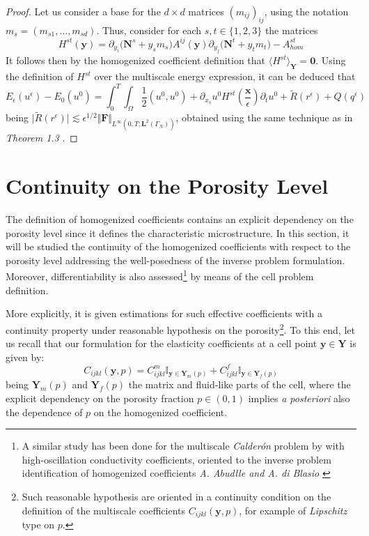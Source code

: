 \begin{proof}
Let us consider a base for the $d\times d$ matrices $(m_{ij})_{ij}$, using the notation $m_s = (m_{s1}, \dots, m_{sd})$. Thus, consider for each $s, t \in \{1,2,3\}$ the matrices 
\begin{equation*}
    H^{st}(\mathbf{y}) = \partial_{y_i}\big(\mathbf{N}^s + y_s m_s\big) A^{ij}(\mathbf{y}) \partial_{y_j} \big(\mathbf{N}^t +  y_t m_t\big) - A^{st}_{hom}
\end{equation*}
It follows then by the homogenized coefficient definition that $\langle H^{st} \rangle_{\mathbf{Y}} = \mathbf{0}$.
Using the definition of $H^{st}$ over the multiscale energy expression, it can be deduced that
\begin{equation*}
    E_{\epsilon}(u^{\epsilon}) - E_{0}(u^{0}) = \int_0^T \int_{\Omega} \frac{1}{2}(u^0, u^0) + \partial_{x_s}u^0 H^{st}(\frac{\mathbf{x}}{\epsilon}) \partial_{t}u^0  + \tilde{R}(r^{\epsilon}) + Q(q^{\epsilon})
\end{equation*}
being $\vert \tilde{R}(r^{\epsilon})\vert \lesssim \epsilon^{1/2}\Vert \mathbf{F} \Vert_{L^{\infty}(0,T;\mathbf{L}^2(\Gamma_N))}$, obtained using the same technique as in \textit{Theorem 1.3} \cite{oleinik1992mathematical}.
\end{proof}

\section{Continuity on the Porosity Level}
The definition of homogenized coefficients contains an explicit dependency on the porosity level since it defines the characteristic microstructure. In this section, it will be studied the continuity of the homogenized coefficients with respect to the porosity level addressing the well-posedness of the inverse problem formulation. Moreover, differentiability is also assessed\footnote{A similar study has been done for the multiscale \textit{Calderón} problem by with high-oscillation conductivity coefficients, oriented to the inverse problem identification of homogenized coefficients \textit{A. Abudlle and A. di Blasio} \cite{Abdulle:221051}} by means of the cell problem definition. 

More explicitly, it is given estimations for such effective coefficients with a continuity property under reasonable hypothesis on the porosity\footnote{Such reasonable hypothesis are oriented in a continuity condition on the definition of the multiscale coefficients $C_{ijkl}(\mathbf{y},p)$, for example of \textit{Lipschitz} type on $p$.}. To this end, let us recall that our formulation for the elasticity coefficients at a cell point $\mathbf{y}\in \mathbf{Y}$ is given by:
\begin{equation*}
    C_{ijkl}(\mathbf{y}, p) = C_{ijkl}^{m} \mathbb{I}_{\mathbf{y} \in \mathbf{Y}_m(p)} + C_{ijkl}^{f} \mathbb{I}_{\mathbf{y} \in \mathbf{Y}_f(p)}
\end{equation*}
being $\mathbf{Y}_m(p)$ and $\mathbf{Y}_f(p)$ the matrix and fluid-like parts of the cell, where the explicit dependency on the porosity fraction $p \in (0,1)$ implies \textit{a posteriori} also the dependence of $p$ on the homogenized coefficient.

